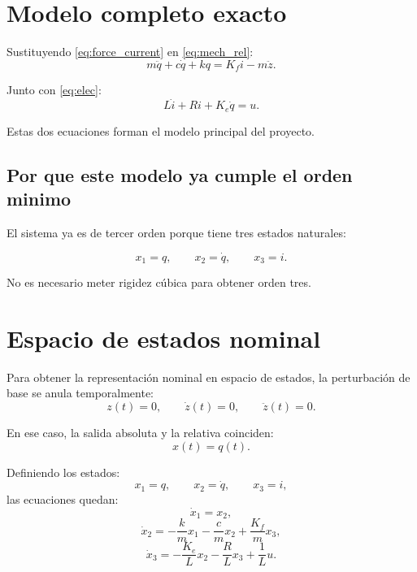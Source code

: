 \documentclass[11pt]{article}
\begin{document}
\section{Modelo completo exacto}

Sustituyendo \eqref{eq:force_current} en \eqref{eq:mech_rel}:
\begin{equation}
m\ddot q + c\dot q + kq = K_f i - m\ddot z.
\label{eq:full_mech}
\end{equation}

Junto con \eqref{eq:elec}:
\begin{equation}
L\dot i + Ri + K_e\dot q = u.
\label{eq:full_elec}
\end{equation}

Estas dos ecuaciones forman el modelo principal del proyecto.

\subsection{Por que este modelo ya cumple el orden minimo}

El sistema ya es de tercer orden porque tiene tres estados naturales:

\begin{equation}
x_1=q,\qquad x_2=\dot q,\qquad x_3=i.
\end{equation}

No es necesario meter rigidez c\'ubica para obtener orden tres.

\section{Espacio de estados nominal}

Para obtener la representaci\'on nominal en espacio de estados, la perturbaci\'on de base se anula temporalmente:
\[
z(t)=0,\qquad \dot z(t)=0,\qquad \ddot z(t)=0.
\]

En ese caso, la salida absoluta y la relativa coinciden:
\[
x(t)=q(t).
\]

Definiendo los estados:
\[
x_1=q,\qquad x_2=\dot q,\qquad x_3=i,
\]
las ecuaciones quedan:
\begin{equation}
\dot x_1 = x_2,
\end{equation}
\begin{equation}
\dot x_2 = -\frac{k}{m}x_1 - \frac{c}{m}x_2 + \frac{K_f}{m}x_3,
\end{equation}
\begin{equation}
\dot x_3 = -\frac{K_e}{L}x_2 - \frac{R}{L}x_3 + \frac{1}{L}u.
\end{equation}
\end{document}
